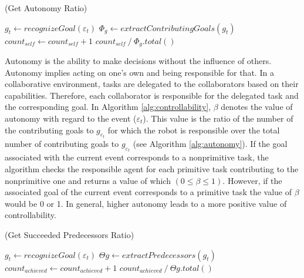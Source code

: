 \documentclass{aamas2016}
\begin{document}
\renewcommand\thealgorithm{4\alph{algorithm}}
\setcounter{algorithm}{1}

\begin{algorithm}
	\caption{(Get Autonomy Ratio)}
	\label{alg:autonomy}
	\begin{algorithmic}[1]
			\Statex
			\State $\mathit{g}_{t} \gets \textit{recognizeGoal}{(\varepsilon_t)}$
			\Statex
			\State $\Phi_{\mathit{g}} \gets
			\textit{extractContributingGoals}{(\mathit{g}_{t})}$
			\Statex
					\State $count_{self} \gets count_{self} + 1$
				\EndIf
			\EndFor
			\Statex
			\State \Return 
			${count_{self} \mathbin{/} {{\Phi_{\mathit{g}}}.total()}}$
		\EndFunction 
	\end{algorithmic}
\end{algorithm}

Autonomy is the ability to make decisions without the influence of others.
Autonomy implies acting on one's own and being responsible for that. In a
collaborative environment, tasks are delegated to the collaborators based on
their capabilities. Therefore, each collaborator is responsible for the
delegated task and the corresponding goal. In Algorithm
\ref{alg:controllability}, $\beta$ denotes the value of autonomy with regard to
the event ($\varepsilon_t$). This value is the ratio of the number of the
contributing goals to $\mathit{g}_{\varepsilon_t}$ for which the robot is
responsible over the total number of contributing goals to
$\mathit{g}_{\varepsilon_t}$ (see Algorithm \ref{alg:autonomy}). If the
goal associated with the current event corresponds to a nonprimitive task, the
algorithm checks the responsible agent for each primitive task contributing to
the nonprimitive one and returns a value of which $(0 \leq \beta \leq 1)$.
However, if the associated goal of the current event corresponds to a primitive
task the value of $\beta$ would be 0 or 1. In general, higher autonomy leads to
a more positive value of controllability.

\renewcommand\thealgorithm{4\alph{algorithm}}
\setcounter{algorithm}{2}

\begin{algorithm}
	\caption{(Get Succeeded Predecessors Ratio)}
	\label{alg:predecessors}
	\begin{algorithmic}[1]
			\Statex
			\State $\mathit{g}_{t} \gets \textit{recognizeGoal}{(\varepsilon_t)}$
			\Statex
			\State $\Theta{\mathit{g}} \gets
			\textit{extractPredecessors}{(\mathit{g}_{t})}$
			\Statex
					\State $count_{achieved} \gets count_{achieved} + 1$
				\EndIf
			\EndFor
			\Statex
			\State \Return
			${count_{achieved} \mathbin{/} {\Theta{\mathit{g}}.total()}}$
		\EndFunction 
	\end{algorithmic}
\end{algorithm}
\end{document}
